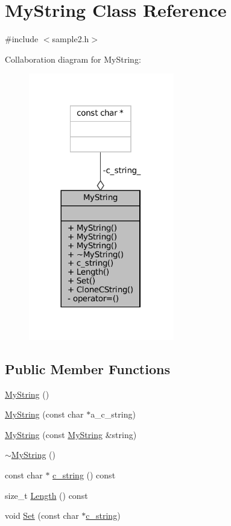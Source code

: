 \hypertarget{classMyString}{}\section{My\+String Class Reference}
\label{classMyString}


{\ttfamily \#include $<$sample2.\+h$>$}



Collaboration diagram for My\+String\+:
\nopagebreak
\begin{figure}[H]
\begin{center}
\leavevmode
\includegraphics[width=180pt]{classMyString__coll__graph}
\end{center}
\end{figure}
\subsection*{Public Member Functions}
\begin{DoxyCompactItemize}
\item 
\hyperlink{classMyString_a1cb17852b83614394b59720779c5f918}{My\+String} ()
\item 
\hyperlink{classMyString_a28134eb91b6698f46b12accefa157d0f}{My\+String} (const char $\ast$a\+\_\+c\+\_\+string)
\item 
\hyperlink{classMyString_ae24c7cf89a58dd2287303df2ac054c66}{My\+String} (const \hyperlink{classMyString}{My\+String} \&string)
\item 
\hyperlink{classMyString_a7bee4fe8ad82a0b7b8f65b02054b156b}{$\sim$\+My\+String} ()
\item 
const char $\ast$ \hyperlink{classMyString_aff2af0cf30db39fe24a235670ee6ff25}{c\+\_\+string} () const
\item 
size\+\_\+t \hyperlink{classMyString_a4eb168b1ec401a732b3859abe004d648}{Length} () const
\item 
void \hyperlink{classMyString_a521c4cd7eccac6ce554d8a51505e4970}{Set} (const char $\ast$\hyperlink{classMyString_aff2af0cf30db39fe24a235670ee6ff25}{c\+\_\+string})
\end{DoxyCompactItemize}
